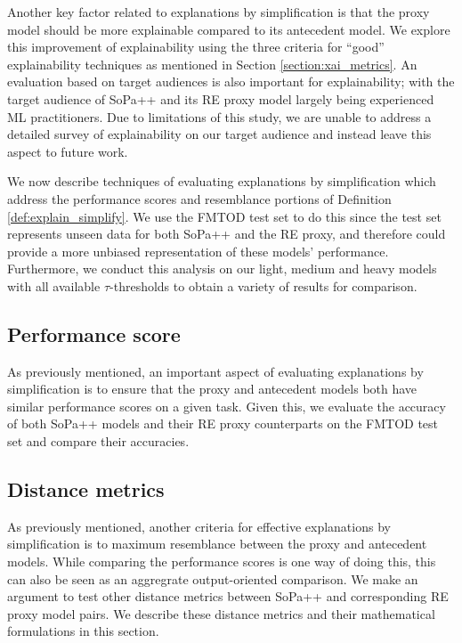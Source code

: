 Another key factor related to explanations by simplification is that the proxy
model should be more explainable compared to its antecedent model. We explore
this improvement of explainability using the three criteria for ``good''
explainability techniques as mentioned in Section \ref{section:xai_metrics}.
An evaluation based on target audiences is also important for explainability;
with the target audience of SoPa++ and its RE proxy model largely being
experienced ML practitioners. Due to limitations of this study, we are unable to
address a detailed survey of explainability on our target audience and instead
leave this aspect to future work.

We now describe techniques of evaluating explanations by simplification which
address the performance scores and resemblance portions of Definition
\ref{def:explain_simplify}. We use the FMTOD test set to do this since the test
set represents unseen data for both SoPa++ and the RE proxy, and therefore could
provide a more unbiased representation of these models' performance.
Furthermore, we conduct this analysis on our light, medium and heavy models with
all available $\tau$-thresholds to obtain a variety of results for comparison.

\subsection{Performance score}

As previously mentioned, an important aspect of evaluating explanations by
simplification is to ensure that the proxy and antecedent models both have
similar performance scores on a given task. Given this, we evaluate the accuracy
of both SoPa++ models and their RE proxy counterparts on the FMTOD test set and
compare their accuracies.

\subsection{Distance metrics}

As previously mentioned, another criteria for effective explanations by
simplification is to maximum resemblance between the proxy and antecedent
models. While comparing the performance scores is one way of doing this, this
can also be seen as an aggregrate output-oriented comparison. We make an
argument to test other distance metrics between SoPa++ and corresponding RE
proxy model pairs. We describe these distance metrics and their mathematical
formulations in this section.

